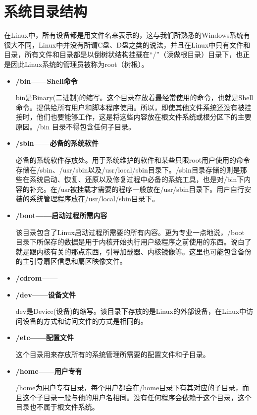 \section{系统目录结构}
在Linux中，所有设备都是用文件名来表示的，这与我们所熟悉的Windows系统有很大不同，Linux中并没有所谓C盘、D盘之类的说法，并且在Linux中只有文件和目录，所有文件和目录都是以倒树状结构挂载在“/”（读做根目录）目录下，也正是因此Linux系统的管理员被称为root（树根）。

\begin{itemize}
\item \textbf{/bin——Shell命令}

\qquad bin是Binary(二进制)的缩写。这个目录存放着最经常使用的命令，也就是Shell命令。提供给所有用户和脚本程序使用。所以，即使其他文件系统还没有被挂接时，他们也要能够工作，这是将这些内容放在根文件系统或根分区下的主要原因。/bin 目录不得包含任何子目录。

\item \textbf{/sbin——必备的系统软件}

\qquad 必备的系统软件存放处。用于系统维护的软件和某些只限root用户使用的命令存储在/sbin、/usr/sbin以及/usr/local/sbin目录下。/sbin目录存储的则是那些在系统启动、恢复、还原以及修复过程中必备的系统工具，也是对/bin下内容的补充。在/usr被挂载才需要的程序一般放在/usr/sbin目录下。用户自行安装的系统管理程序放在/usr/local/sbin目录下。

\item \textbf{/boot——启动过程所需内容}

\qquad 该目录包含了Linux启动过程所需要的所有内容。更为专业一点地说，/boot 目录下所保存的数据是用于内核开始执行用户级程序之前使用的东西。说白了就是跟内核有关的那点东西，引导加载器、内核镜像等。这里也可能包含备份的主引导扇区信息和扇区映像文件。

\item \textbf{/cdrom——}

\item \textbf{/dev——设备文件}

\qquad dev是Device(设备)的缩写。该目录下存放的是Linux的外部设备，在Linux中访问设备的方式和访问文件的方式是相同的。

\item \textbf{/etc——配置文件}

\qquad 这个目录用来存放所有的系统管理所需要的配置文件和子目录。

\item \textbf{/home——用户专有}

\qquad /home为用户专有目录，每个用户都会在/home目录下有其对应的子目录，而且这个子目录一般与他的用户名相同。没有任何程序会依赖于这个目录，这个目录也不属于根文件系统。


\end{itemize}
